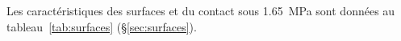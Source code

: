 Les caractéristiques des surfaces et du contact sous \SI{1.65}{MPa} sont données au tableau~\ref{tab:surfaces} (\S\ref{sec:surfaces}).
